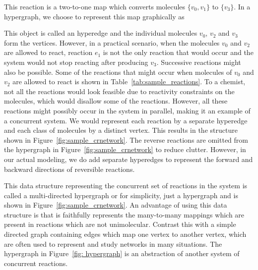 This reaction is a two-to-one map which converts molecules $\{v_0, v_1\}$ to $\{v_3\}$. In a hypergraph, we choose to represent this map graphically as
\begin{center}
\end{center}

This object is called an hyperedge and the individual molecules $v_0$, $v_2$ and $v_3$ form the vertices. However, in a practical scenario, when the molecules $v_0$ and $v_2$ are allowed to react, reaction $e_1$ is not the only reaction that would occur and the system would not stop reacting after producing $v_3$. Successive reactions might also be possible.
Some of the reactions that might occur when molecules of $v_0$ and $v_2$ are allowed to react is shown in Table~\ref{tab:sample_reactions}. To a chemist, not all the reactions would look feasible due to reactivity constraints on the molecules, which would disallow some of the reactions. However, all these reactions might possibly occur in the system in parallel, making it an example of a concurrent system. 
We would represent each reaction by a separate hyperedge and each class of molecules by a distinct vertex. This results in the structure shown in Figure~\ref{fig:sample_crnetwork}.
The reverse reactions are omitted from the hypergraph in Figure~\ref{fig:sample_crnetwork} to reduce clutter. However, in our actual modeling, we do add separate hyperedges to represent the forward and backward directions of reversible reactions.

This data structure representing the concurrent set of reactions in the system is called a multi-directed hypergraph or for simplicity, just a hypergraph and is shown in Figure~\ref{fig:sample_crnetwork}. An advantage of using this data structure is that is faithfully represents the many-to-many mappings which are present in reactions which are not unimolecular. Contrast this with a simple directed graph containing edges which map one vertex to another vertex, which are often used to represent and study networks in many situations. The hypergraph in Figure~\ref{fig: hypergraph} is an abstraction of another system of concurrent reactions.

